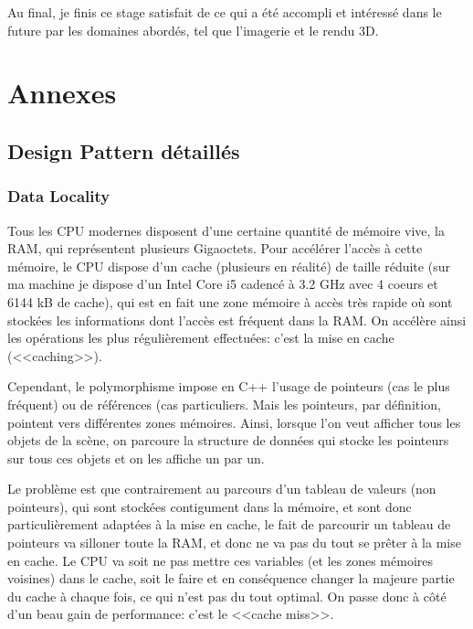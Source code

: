 \documentclass[a4paper,french,12pt]{article}
\begin{document}
	Au final, je finis ce stage satisfait de ce qui a été accompli et intéressé dans le future par les domaines abordés, 
	tel que l'imagerie et le rendu 3D.
	\newpage
\section{Annexes}
	
	\subsection{Design Pattern détaillés}
	  \subsubsection{Data Locality}
	  \label{data_locality}
	      Tous les CPU modernes disposent d'une certaine quantité de mémoire vive, la RAM, qui représentent
	      plusieurs Gigaoctets. Pour accélérer l'accès à cette mémoire, le CPU dispose d'un cache (plusieurs en réalité)
	      de taille réduite (sur ma machine je dispose d'un Intel Core i5 cadencé à 3.2 GHz avec 4 coeurs et 6144 kB
	      de cache), qui est en fait une zone mémoire à accès très rapide où sont stockées les informations dont l'accès est fréquent
	      dans la RAM. On accélère ainsi les opérations les plus régulièrement effectuées: c'est la mise en cache (<<caching>>).
	      
	      Cependant, le polymorphisme impose en C++ l'usage de pointeurs (cas le plus fréquent) ou de références (cas particuliers. 
	      Mais les pointeurs, par définition, pointent vers différentes zones mémoires.
	      Ainsi, lorsque l'on veut afficher tous les objets de la scène, on parcoure la structure de données qui
	      stocke les pointeurs sur tous ces objets et on les affiche un par un.
	      
	      Le problème est que contrairement au parcours d'un tableau de valeurs (non pointeurs), qui sont stockées
	      contigument dans la mémoire, et sont donc particulièrement adaptées à la mise en cache, le fait de
	      parcourir un tableau de pointeurs va silloner toute la RAM, et donc ne va pas du tout se prêter à la mise
	      en cache. Le CPU va soit ne pas mettre ces variables (et les zones mémoires voisines) dans le cache, soit le faire
	      et en conséquence changer la majeure partie du cache à chaque fois, ce qui n'est pas du tout optimal.
	      On passe donc à côté d'un beau gain de performance: c'est le <<cache miss>>.
	      
\end{document}
